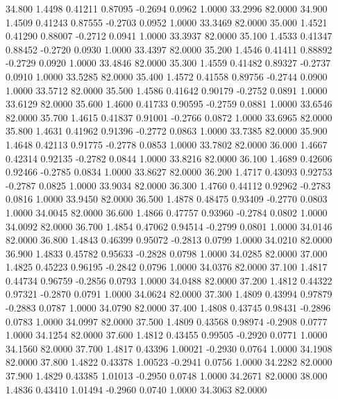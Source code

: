   34.800   1.4498   0.41211   0.87095  -0.2694   0.0962   1.0000  33.2996  82.0000
  34.900   1.4509   0.41243   0.87555  -0.2703   0.0952   1.0000  33.3469  82.0000
  35.000   1.4521   0.41290   0.88007  -0.2712   0.0941   1.0000  33.3937  82.0000
  35.100   1.4533   0.41347   0.88452  -0.2720   0.0930   1.0000  33.4397  82.0000
  35.200   1.4546   0.41411   0.88892  -0.2729   0.0920   1.0000  33.4846  82.0000
  35.300   1.4559   0.41482   0.89327  -0.2737   0.0910   1.0000  33.5285  82.0000
  35.400   1.4572   0.41558   0.89756  -0.2744   0.0900   1.0000  33.5712  82.0000
  35.500   1.4586   0.41642   0.90179  -0.2752   0.0891   1.0000  33.6129  82.0000
  35.600   1.4600   0.41733   0.90595  -0.2759   0.0881   1.0000  33.6546  82.0000
  35.700   1.4615   0.41837   0.91001  -0.2766   0.0872   1.0000  33.6965  82.0000
  35.800   1.4631   0.41962   0.91396  -0.2772   0.0863   1.0000  33.7385  82.0000
  35.900   1.4648   0.42113   0.91775  -0.2778   0.0853   1.0000  33.7802  82.0000
  36.000   1.4667   0.42314   0.92135  -0.2782   0.0844   1.0000  33.8216  82.0000
  36.100   1.4689   0.42606   0.92466  -0.2785   0.0834   1.0000  33.8627  82.0000
  36.200   1.4717   0.43093   0.92753  -0.2787   0.0825   1.0000  33.9034  82.0000
  36.300   1.4760   0.44112   0.92962  -0.2783   0.0816   1.0000  33.9450  82.0000
  36.500   1.4878   0.48475   0.93409  -0.2770   0.0803   1.0000  34.0045  82.0000
  36.600   1.4866   0.47757   0.93960  -0.2784   0.0802   1.0000  34.0092  82.0000
  36.700   1.4854   0.47062   0.94514  -0.2799   0.0801   1.0000  34.0146  82.0000
  36.800   1.4843   0.46399   0.95072  -0.2813   0.0799   1.0000  34.0210  82.0000
  36.900   1.4833   0.45782   0.95633  -0.2828   0.0798   1.0000  34.0285  82.0000
  37.000   1.4825   0.45223   0.96195  -0.2842   0.0796   1.0000  34.0376  82.0000
  37.100   1.4817   0.44734   0.96759  -0.2856   0.0793   1.0000  34.0488  82.0000
  37.200   1.4812   0.44322   0.97321  -0.2870   0.0791   1.0000  34.0624  82.0000
  37.300   1.4809   0.43994   0.97879  -0.2883   0.0787   1.0000  34.0790  82.0000
  37.400   1.4808   0.43745   0.98431  -0.2896   0.0783   1.0000  34.0997  82.0000
  37.500   1.4809   0.43568   0.98974  -0.2908   0.0777   1.0000  34.1254  82.0000
  37.600   1.4812   0.43455   0.99505  -0.2920   0.0771   1.0000  34.1560  82.0000
  37.700   1.4817   0.43396   1.00021  -0.2930   0.0764   1.0000  34.1908  82.0000
  37.800   1.4822   0.43378   1.00523  -0.2941   0.0756   1.0000  34.2282  82.0000
  37.900   1.4829   0.43385   1.01013  -0.2950   0.0748   1.0000  34.2671  82.0000
  38.000   1.4836   0.43410   1.01494  -0.2960   0.0740   1.0000  34.3063  82.0000
